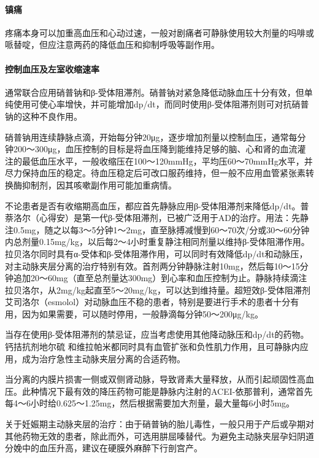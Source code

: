\paragraph{镇痛}

疼痛本身可以加重高血压和心动过速，一般对剧痛者可静脉使用较大剂量的吗啡或哌替啶，但应注意两药的降低血压和抑制呼吸等副作用。

\paragraph{控制血压及左室收缩速率}

通常联合应用硝普钠和β-受体阻滞剂。硝普钠对紧急降低动脉血压十分有效，但单纯使用可使心率增快，并可能增加dp/dt，而同时使用β-受体阻滞剂则可对抗硝普钠的这种不良作用。

硝普钠用连续静脉点滴，开始每分钟20μg，逐步增加剂量以控制血压，通常每分钟200～300μg，血压控制的目标是将血压降到能维持足够的脑、心和肾的血流灌注的最低血压水平，一般收缩压在100～120mmHg，平均压60～70mmHg水平，并尽力保持血压的稳定。待血压稳定后可改口服药维持，但一般不应用血管紧张素转换酶抑制剂，因其咳嗽副作用可能加重病情。

不论患者是否有收缩期高血压，都应首先静脉应用β-受体阻滞剂来降低dp/dt。普萘洛尔（心得安）是第一代β-受体阻滞剂，已被广泛用于AD的治疗。用法：先静注0.5mg，随之以每3～5分钟1～2mg，直至脉搏减慢到60～70次/分或30～60分钟内总剂量0.15mg/kg，以后每2～4小时重复静注相同剂量以维持β-受体阻滞作用。拉贝洛尔同时具有α-受体和β-受体阻滞作用，可以同时有效降低dp/dt和动脉压，对主动脉夹层分离的治疗特别有效。首剂两分钟静脉注射10mg，然后每10～15分钟追加20～60mg（直至总剂量达300mg）到心率和血压控制为止。静脉持续滴注拉贝洛尔，从2mg/kg起直至5～20mg/kg，可以达到维持量。超短效β-受体阻滞剂艾司洛尔（esmolol）对动脉血压不稳的患者，特别是要进行手术的患者十分有用，因为如果需要，可以随时停用，一般静滴每分钟50～200μg/kg。

当存在使用β-受体阻滞剂的禁忌证，应当考虑使用其他降动脉压和dp/dt的药物。钙拮抗剂地尔硫{}
和维拉帕米都同时具有血管扩张和负性肌力作用，且可静脉内应用，成为治疗急性主动脉夹层分离的合适药物。

当分离的内膜片损害一侧或双侧肾动脉，导致肾素大量释放，从而引起顽固性高血压。此种情况下最有效的降压药物可能是静脉内注射的ACEI-依那普利，通常首先每4～6小时给0.625～1.25mg，然后根据需要加大剂量，最大量每6小时5mg。

关于妊娠期主动脉夹层的治疗：由于硝普钠的胎儿毒性，一般只用于产后或孕期对其他药物无效的患者，除此而外，可选用肼屈嗪替代。为避免主动脉夹层孕妇阴道分娩中的血压升高，建议在硬膜外麻醉下行剖宫产。

